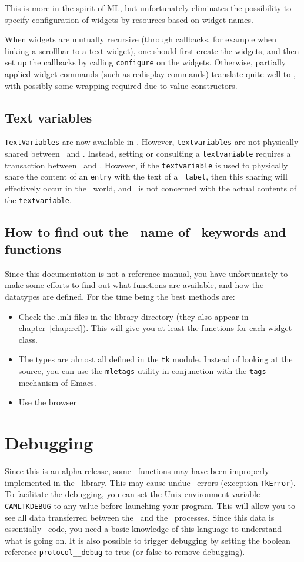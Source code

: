 This is more in the spirit of ML, but unfortunately eliminates the
possibility to specify configuration of widgets by resources based on widget
names.



When widgets are mutually recursive (through callbacks, for example when
linking a scrollbar to a text widget), one should first create the widgets,
and then set up the callbacks by calling \verb|configure| on the widgets.
Otherwise, partially applied widget commands (such as redisplay commands)
translate quite well to \caml, with possibly some wrapping required due to
value constructors.

\subsection{Text variables}
\verb|TextVariables| are now available in \caml\tk. However,
\verb|textvariables| are not physically shared between \caml\ and \tk.
Instead, setting or consulting a \verb|textvariable| requires a transaction
between \caml\ and \tk. However, if the \verb|textvariable| is used to
physically share the content of an {\tt entry} with the text of a {\tt
label}, then this sharing will effectively occur in the \tk\ world, and
\caml\ is not concerned with the actual contents of the \verb|textvariable|.

\subsection{How to find out the \caml\ name of \tk\ keywords and functions}
Since this documentation is not a reference manual, you have unfortunately
to make some efforts to find out what functions are available, and how the
datatypes are defined. For the time being the best methods are:
\begin{itemize}
\item Check the .mli files in the library directory (they also appear in
chapter~\ref{chap:ref}). This will give you at
least the functions for each widget class.
\item The types are almost all defined in the \verb|tk| module. Instead of
looking at the source, you can use the {\tt mletags} utility in conjunction
with the {\tt tags} mechanism of Emacs. 
\item Use the browser
\end{itemize} 

\section{Debugging}
Since this is an alpha release, some \tk\ functions may have been improperly
implemented in the \caml\ library. This may cause undue \tk\ errors
(exception \verb|TkError|). To facilitate the debugging, you can set the
Unix environment variable \verb|CAMLTKDEBUG| to any value before launching
your program. This will allow you to see all
data transferred between the \caml\ and the \tk\ processes. Since this data is
essentially \tcl\tk\ code, you need a basic knowledge of this language to
understand what is going on.
It is also possible to trigger debugging by setting the boolean reference
\verb|protocol__debug| to true (or false to remove debugging).


